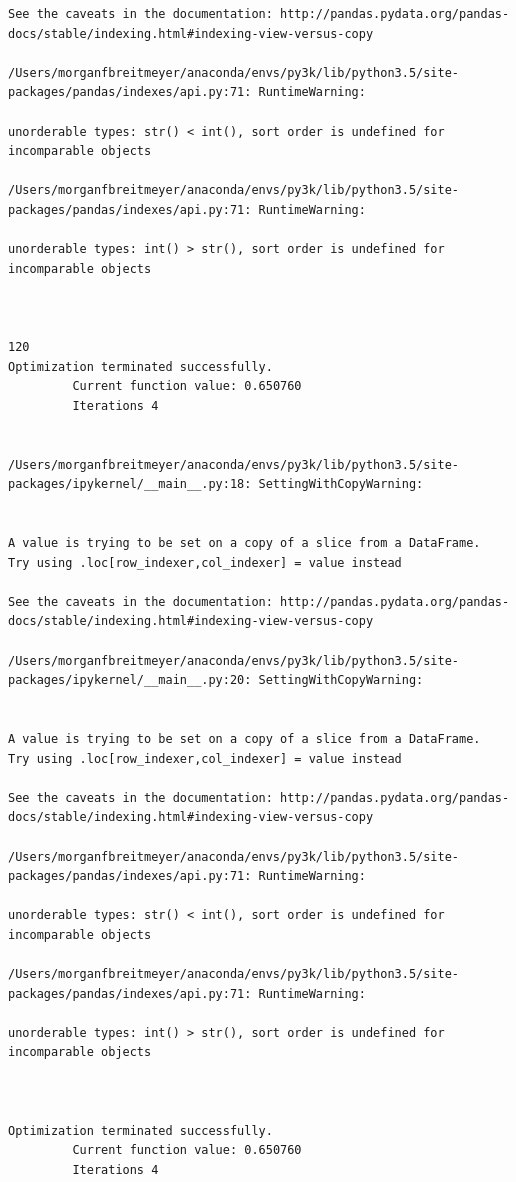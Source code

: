 \begin{lstlisting}
See the caveats in the documentation: http://pandas.pydata.org/pandas-docs/stable/indexing.html#indexing-view-versus-copy

/Users/morganfbreitmeyer/anaconda/envs/py3k/lib/python3.5/site-packages/pandas/indexes/api.py:71: RuntimeWarning:

unorderable types: str() < int(), sort order is undefined for incomparable objects

/Users/morganfbreitmeyer/anaconda/envs/py3k/lib/python3.5/site-packages/pandas/indexes/api.py:71: RuntimeWarning:

unorderable types: int() > str(), sort order is undefined for incomparable objects



120
Optimization terminated successfully.
         Current function value: 0.650760
         Iterations 4


/Users/morganfbreitmeyer/anaconda/envs/py3k/lib/python3.5/site-packages/ipykernel/__main__.py:18: SettingWithCopyWarning:


A value is trying to be set on a copy of a slice from a DataFrame.
Try using .loc[row_indexer,col_indexer] = value instead

See the caveats in the documentation: http://pandas.pydata.org/pandas-docs/stable/indexing.html#indexing-view-versus-copy

/Users/morganfbreitmeyer/anaconda/envs/py3k/lib/python3.5/site-packages/ipykernel/__main__.py:20: SettingWithCopyWarning:


A value is trying to be set on a copy of a slice from a DataFrame.
Try using .loc[row_indexer,col_indexer] = value instead

See the caveats in the documentation: http://pandas.pydata.org/pandas-docs/stable/indexing.html#indexing-view-versus-copy

/Users/morganfbreitmeyer/anaconda/envs/py3k/lib/python3.5/site-packages/pandas/indexes/api.py:71: RuntimeWarning:

unorderable types: str() < int(), sort order is undefined for incomparable objects

/Users/morganfbreitmeyer/anaconda/envs/py3k/lib/python3.5/site-packages/pandas/indexes/api.py:71: RuntimeWarning:

unorderable types: int() > str(), sort order is undefined for incomparable objects



Optimization terminated successfully.
         Current function value: 0.650760
         Iterations 4



\end{lstlisting}
